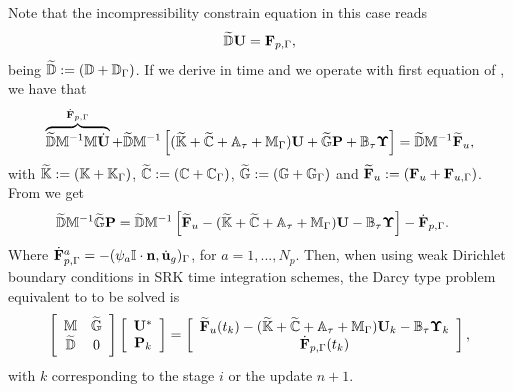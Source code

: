 Note that the incompressibility constrain equation in this case reads
\begin{equation}
\label{eq-C7_inc_constraint_eq_weak}
\widetilde{\mathbb{D}}{\bf U}={\bf F}_{p,\Gamma},
\end{equation}
being $ \widetilde{\mathbb{D}}:=(\mathbb{D}+\mathbb{D}_\Gamma) $. If we derive  in time and we operate with first equation of , we have that
\begin{align}
\label{eq-C7_SRK_weak_u}
\overbrace{\widetilde{\mathbb{D}}\mathbb{M}^{-1}\mathbb{M}\dot{{\bf U}}}^{\dot{{\bf F}}_{p,\Gamma}}
+\widetilde{\mathbb{D}}\mathbb{M}^{-1}\left[(\widetilde{\mathbb{K}}+\widetilde{\mathbb{C}}+\mathbb{A}_\tau+\mathbb{M}_\Gamma){\bf U}+\widetilde{\mathbb{G}}{\bf P}+\mathbb{B}_\tau\boldsymbol{\Upsilon}\right] = \widetilde{\mathbb{D}}\mathbb{M}^{-1}\widetilde{{\bf F}}_u,
\end{align}
with $ \widetilde{\mathbb{K}}:=(\mathbb{K}+\mathbb{K}_\Gamma) $, $ \widetilde{\mathbb{C}}:=(\mathbb{C}+\mathbb{C}_\Gamma) $, $ \widetilde{\mathbb{G}}:=(\mathbb{G}+\mathbb{G}_\Gamma) $ and $ \widetilde{{\bf F}}_u:=({\bf F}_u+{\bf F}_{u,\Gamma}) $. From  we get
\begin{align}
\label{eq-C7_SRK_weak_dm1p}
&\widetilde{\mathbb{D}}\mathbb{M}^{-1}\widetilde{\mathbb{G}}{\bf P} = \widetilde{\mathbb{D}}\mathbb{M}^{-1}\left[\widetilde{{\bf F}}_u-(\widetilde{\mathbb{K}}+\widetilde{\mathbb{C}}+\mathbb{A}_\tau+\mathbb{M}_\Gamma){\bf U}-\mathbb{B}_\tau\boldsymbol{\Upsilon}\right] - \dot{{\bf F}}_{p,\Gamma}.
\end{align}
Where $\dot{{\bf F}}_{p,\Gamma}^a=-(\psi_{a}\mathbb{I}\cdot{\bf n},\dot{{\bf u}}_g)_\Gamma$, for $a=1,...,N_p$. Then, when using weak Dirichlet boundary conditions in SRK time integration schemes, the Darcy type problem equivalent to  to be solved is
\begin{equation}
\label{eq-C7_SRK_upeta_RK_p_darcy_weak}
\left[\begin{array}{cc}
\mathbb{M}&\widetilde{\mathbb{G}}\\
\widetilde{\mathbb{D}}&0
\end{array}\right]\left[\begin{array}{c}
{\bf U}^*\\
{\bf P}_k
\end{array}\right]=\left[\begin{array}{c}
\widetilde{{\bf F}}_u(t_k)-(\widetilde{\mathbb{K}}+\widetilde{\mathbb{C}}+\mathbb{A}_\tau+\mathbb{M}_\Gamma){\bf U}_k-\mathbb{B}_\tau\boldsymbol{\Upsilon}_k\\
\dot{{\bf F}}_{p,\Gamma}(t_k)
\end{array}\right],
\end{equation}
with $k$ corresponding to the stage $i$ or the update $n+1$.

